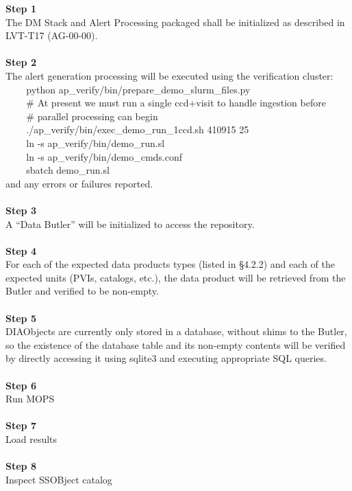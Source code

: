 \textbf{Step 1}\\
The DM Stack and Alert Processing packaged shall be initialized as
described in LVT-T17 (AG-00-00).\\
~\\
\textbf{Step 2}\\
The alert generation processing will be executed using the verification
cluster:\\
\hspace*{0.333em} ~ ~ ~python
ap\_verify/bin/prepare\_demo\_slurm\_files.py\\
\hspace*{0.333em} ~ ~ ~\# At present we must run a single ccd+visit to
handle ingestion before\\
\hspace*{0.333em} ~ ~ ~\# parallel processing can begin\\
\hspace*{0.333em} ~ ~ ~./ap\_verify/bin/exec\_demo\_run\_1ccd.sh 410915
25\\
\hspace*{0.333em} ~ ~ ~ln -s ap\_verify/bin/demo\_run.sl\\
\hspace*{0.333em} ~ ~ ~ln -s ap\_verify/bin/demo\_cmds.conf\\
\hspace*{0.333em} ~ ~ ~sbatch demo\_run.sl\\
and any errors or failures reported.\\
~\\
\textbf{Step 3}\\
A ``Data Butler'' will be initialized to access the repository.\\
~\\
\textbf{Step 4}\\
For each of the expected data products types (listed in §4.2.2) and each
of the expected units (PVIs, catalogs, etc.), the data product will be
retrieved from the Butler and verified to be non-empty.\\
~\\
\textbf{Step 5}\\
DIAObjects are currently only stored in a database, without shims to the
Butler, so the existence of the database table and its non-empty
contents will be verified by directly accessing it using sqlite3 and
executing appropriate SQL queries.\\
~\\
\textbf{Step 6}\\
Run MOPS\\
~\\
\textbf{Step 7}\\
Load results\\
~\\
\textbf{Step 8}\\
Inspect SSOBject catalog\\
~\\

